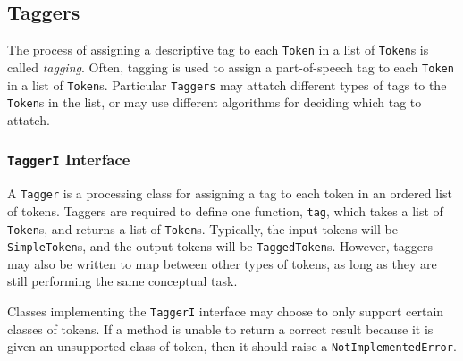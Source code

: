 \documentclass{article}
\begin{document}
\subsection{Taggers}

The process of assigning a descriptive tag to each \texttt{Token} in a
list of \texttt{Token}s is called \emph{tagging}.  Often, tagging is
used to assign a part-of-speech tag to each \texttt{Token} in a list
of \texttt{Token}s.  Particular \texttt{Taggers} may attatch different
types of tags to the \texttt{Token}s in the list, or may use different
algorithms for deciding which tag to attatch.

\subsubsection{\texttt{TaggerI} Interface}

    A \texttt{Tagger} is a processing class for assigning a tag to
    each token in an ordered list of tokens.  Taggers are required to
    define one function, \texttt{tag}, which takes a list of
    \texttt{Token}s, and returns a list of \texttt{Token}s.
    Typically, the input tokens will be \texttt{SimpleToken}s, and the
    output tokens will be \texttt{TaggedToken}s.  However, taggers may
    also be written to map between other types of tokens, as long as
    they are still performing the same conceptual task.

    Classes implementing the \texttt{TaggerI} interface may choose to
    only support certain classes of tokens.  If a method is unable to
    return a correct result because it is given an unsupported class
    of token, then it should raise a \texttt{NotImplementedError}.
\end{document}
